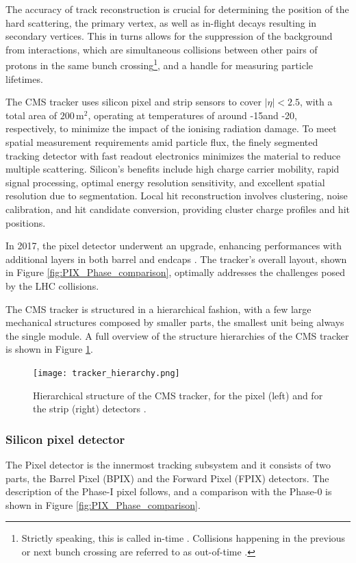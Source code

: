 The accuracy of track reconstruction is crucial for determining the position of the hard scattering, the primary vertex, as well as in-flight decays resulting in secondary vertices.
This in turns allows for the suppression of the background from \pileup{} interactions,
which are simultaneous collisions between other pairs of protons in the same bunch crossing\footnote{
Strictly speaking, this is called in-time \pileup.
Collisions happening in the previous or next bunch crossing are referred to as out-of-time \pileup.
},
and a handle for measuring particle lifetimes.

The CMS tracker uses silicon pixel and strip sensors to cover $|\eta| < 2.5$, with a total area of $200\, \mathrm{m}^2$,
operating at temperatures of around -15\Celsius and -20\Celsius, respectively, to minimize the impact of the ionising radiation damage.
To meet spatial measurement requirements amid particle flux, the finely segmented tracking detector with fast readout electronics minimizes the material to reduce multiple scattering.
Silicon's benefits include high charge carrier mobility, rapid signal processing, optimal energy resolution sensitivity, and excellent spatial resolution due to segmentation.
Local hit reconstruction involves clustering, noise calibration, and hit candidate conversion, providing cluster charge profiles and hit positions.

In 2017, the pixel detector underwent an upgrade, enhancing performances with additional layers in both barrel and endcaps \cite{CMS-TDR-11}.
The tracker's overall layout, shown in Figure \ref{fig:PIX_Phase_comparison}, optimally addresses the challenges posed by the LHC collisions.

The CMS tracker is structured in a hierarchical fashion, with a few large mechanical structures composed by smaller parts,
the smallest unit being always the single module.
A full overview of the structure hierarchies of the CMS tracker is shown in Figure \ref{fig:tracker_hierarchy}.

\begin{figure}
  \centering
  \texttt{[image: tracker\_hierarchy.png]}
  \caption{Hierarchical structure of the CMS tracker, for the pixel (left) and for the strip (right) detectors \cite{CMS-NOTE-2009-002}.}
  \label{fig:tracker_hierarchy}
\end{figure}

\subsubsection{Silicon pixel detector}
The Pixel detector is the innermost tracking subsystem and it consists of two parts, the Barrel Pixel (BPIX) and the Forward Pixel (FPIX) detectors.
The description of the Phase-I pixel follows, and a comparison with the Phase-0 is shown in Figure \ref{fig:PIX_Phase_comparison}.

